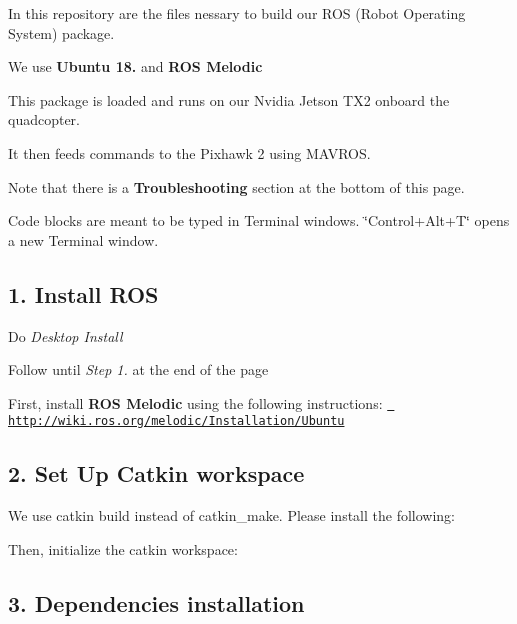 In this repository are the files nessary to build our R\+OS (Robot Operating System) package.

We use {\bfseries{Ubuntu 18.}} and {\bfseries{R\+OS Melodic}}

This package is loaded and runs on our Nvidia Jetson T\+X2 onboard the quadcopter.

It then feeds commands to the Pixhawk 2 using M\+A\+V\+R\+OS.

Note that there is a {\bfseries{Troubleshooting}} section at the bottom of this page.

Code blocks are meant to be typed in Terminal windows. \char`\"{}\+Control+\+Alt+\+T\char`\"{} opens a new Terminal window.

\subsection*{1. Install R\+OS}


\begin{DoxyItemize}
\item Do {\itshape Desktop Install}
\item Follow until {\itshape Step 1.} at the end of the page
\end{DoxyItemize}

First, install {\bfseries{R\+OS Melodic}} using the following instructions\+: \href{http://wiki.ros.org/melodic/Installation/Ubuntu}{\texttt{ http\+://wiki.\+ros.\+org/melodic/\+Installation/\+Ubuntu}}

\subsection*{2. Set Up Catkin workspace}

We use {\ttfamily catkin build} instead of {\ttfamily catkin\+\_\+make}. Please install the following\+: 
\begin{DoxyCode}{0}
\end{DoxyCode}


Then, initialize the catkin workspace\+: 
\begin{DoxyCode}{0}
\end{DoxyCode}


\subsection*{3. Dependencies installation}

